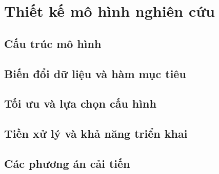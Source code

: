 \par{}
\section{Thiết kế mô hình nghiên cứu}\label{section:image-design-1}

\par{}
\subsection{Cấu trúc mô hình}\label{subsection:image-design-2}

\par{}
\subsection{Biến đổi dữ liệu và hàm mục tiêu}\label{subsection:image-design-3}

\par{}
\subsection{Tối ưu và lựa chọn cấu hình}\label{subsection:image-design-4}

\par{}
\subsection{Tiền xử lý và khả năng triển khai}\label{subsection:image-design-5}

\par{}
\subsection{Các phương án cải tiến}\label{subsection:image-design-6}

